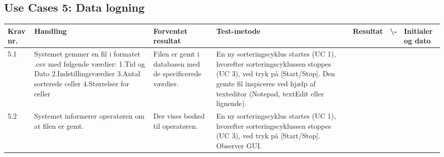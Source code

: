  \subsection{Use Cases 5: Data logning}
\begin{center}
		\begin{longtable}{ | m{1.785cm} | m{1.785cm}| m{1.785cm}| m{1.785cm}| m{1.785cm}| m{1.785cm}|m{1.785cm}| } 
			\hline
			\textbf{Krav nr.} &\textbf{ Handling} & \textbf{Forventet resultat} & \textbf{Test-metode} &\textbf{Resultat} & \textbf{ \checkmark \textbackslash -} & \textbf{Initialer og dato} \\ 
			
			\hline
			5.1 &  Systemet gemmer en fil i formatet .csv med følgende værdier:
1.Tid og Dato
2.Indstillingsværdier
3.Antal sorterede celler
4.Størrelser for celler
 & Filen er gemt i databasen med de specificerede værdier. & En ny sorteringscyklus startes (UC 1), hvorefter sorteringscyklussen stoppes (UC 3), ved tryk på [Start/Stop]. 
Den gemte fil inspiceres ved hjælp af texteditor (Notepad, textEdit eller lignende). &  & & \\
			\hline
			
			5.2 &  Systemet informerer operatøren om at filen er gemt. & Der vises besked til operatøren. & En ny sorteringscyklus startes (UC 1), hvorefter sorteringscyklussen stoppes (UC 3), ved tryk på [Start/Stop]. Observer GUI.   &  & & \\
			\hline
			
		\end{longtable}
		
	\end{center}
	\pagebreak